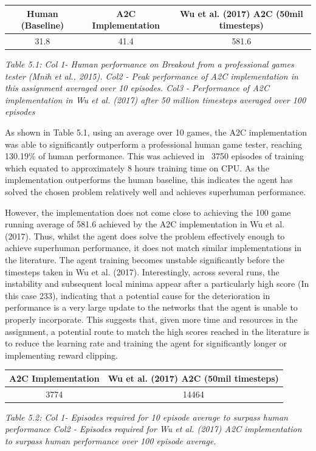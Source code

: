 \documentclass{article}
\begin{document}
\begin{table}[h!]
\centering
\begin{tabular}{|c | c | c |} 
 \hline
 Human (Baseline) & A2C Implementation & Wu et al. (2017) A2C (50mil timesteps) \\ [0.5ex] 
 \hline
 31.8 & 41.4 & 581.6  \\ 
 \hline
\end{tabular}
\end{table}
\emph{Table 5.1: Col 1- Human performance on Breakout from a professional games tester (Mnih et al., 2015). Col2 - Peak performance of A2C implementation in this assignment averaged over 10 episodes. Col3 - Performance of A2C implementation in Wu et al. (2017)  after 50 million timesteps averaged over 100 episodes}

As shown in Table 5.1, using an average over 10 games, the A2C implementation was able to significantly outperform a professional human game tester, reaching 130.19\% of human performance. This was achieved in ~3750 episodes of training which equated to approximately 8 hours training time on CPU. As the implementation outperforms the human baseline, this indicates the agent has solved the chosen problem relatively well and achieves superhuman performance. 

However, the implementation does not come close to achieving the 100 game running average of 581.6 achieved by the A2C implementation in Wu et al. (2017). Thus, whilst the agent does solve the problem effectively enough to achieve superhuman performance, it does not match similar implementations in the literature. The agent training becomes unstable significantly before the timesteps taken in Wu et al. (2017). Interestingly, across several runs, the instability and subsequent local minima appear after a particularly high score (In this case 233), indicating that a potential cause for the deterioration in performance is a very large update to the networks that the agent is unable to properly incorporate. This suggests that, given more time and resources in the assignment, a potential route to match the high scores reached in the literature is to reduce the learning rate and training the agent for significantly longer or implementing reward clipping.

\begin{table}[h!]
\centering
\begin{tabular}{|c | c|} 
 \hline
 A2C Implementation & Wu et al. (2017) A2C (50mil timesteps) \\ [0.5ex] 
 \hline
 3774 & 14464   \\ 
 \hline
\end{tabular}
\end{table}
\emph{Table 5.2: Col 1- Episodes required for 10 episode average to surpass human performance Col2 - Episodes required for Wu et al. (2017) A2C implementation to surpass human performance over 100 episode average.}
\end{document}
